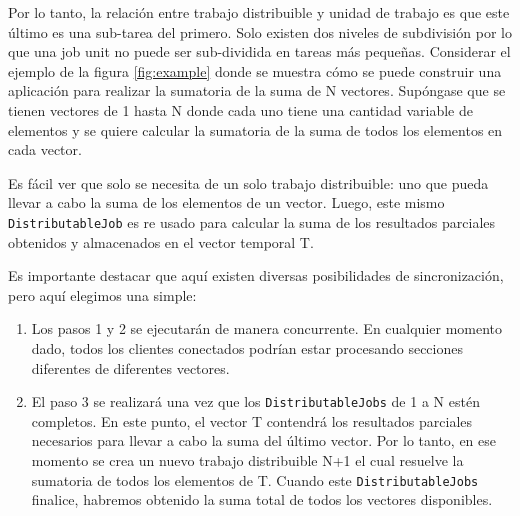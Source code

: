 Por lo tanto, la relación entre trabajo distribuible y unidad de trabajo es que este último es una sub-tarea del primero. Solo existen dos niveles de subdivisión 
por lo que una job unit no puede ser sub-dividida en tareas más pequeñas. Considerar el ejemplo de la figura \ref{fig:example} donde se muestra cómo se puede construir una aplicación
 para realizar la sumatoria de la suma de N vectores. Supóngase que  se tienen vectores de 1 hasta N donde cada uno tiene una cantidad variable de elementos y se quiere calcular
 la sumatoria de la suma de todos los elementos en cada vector.

  Es fácil ver que solo se necesita de un solo trabajo distribuible: uno que pueda llevar a cabo la suma de los elementos
 de un vector. Luego, este mismo \texttt{DistributableJob} es re usado para calcular la suma de los resultados parciales obtenidos y almacenados en el vector temporal T.

Es importante destacar que aquí existen diversas posibilidades de sincronización, pero aquí elegimos una simple:

\begin{enumerate}
 \item  Los pasos 1 y 2 se ejecutarán de manera concurrente. En cualquier momento dado, todos los clientes conectados podrían estar procesando secciones diferentes de diferentes vectores.
\item El paso 3 se realizará una vez que los \texttt{DistributableJobs} de 1 a N estén completos. En este punto, el vector T contendrá los resultados parciales necesarios para llevar
 a cabo la suma del último vector. Por lo tanto, en ese momento se crea un nuevo trabajo distribuible N+1 el cual resuelve la sumatoria de todos los elementos de T. Cuando
 este \texttt{DistributableJobs} finalice, habremos obtenido la suma total de todos los vectores disponibles.
\end{enumerate}


